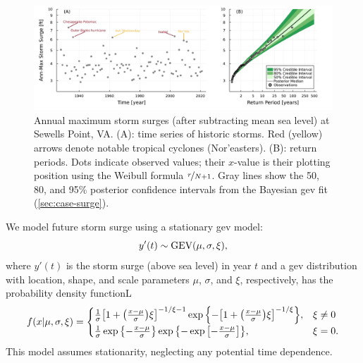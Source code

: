 \documentclass[11pt]{article}
\begin{document}
\begin{figure}
    \centering
    \includegraphics[width=\textwidth]{surge-obs-return}
    \caption{
        Annual maximum storm surges (after subtracting mean sea level) at Sewells Point, VA.
        (A):
        time series of historic storms.
        Red (yellow) arrows denote notable tropical cyclones (Nor'easters).
        (B):
        return periods.
        Dots indicate observed values; their $x$-value is their plotting position using the Weibull formula $\nicefrac{r}{N+1}$.
        Gray lines show the 50, 80, and 95\% posterior confidence intervals from the Bayesian \gls{gev} fit (\cref{sec:case-surge}).
    }\label{fig:surge-obs-return}
\end{figure}

We model future storm surge using a stationary \gls{gev} model:
\begin{equation}\label{eq:surge-model}
    y'(t) \sim \text{GEV}\qty(\mu, \sigma, \xi),
\end{equation}
where $y'(t)$ is the storm surge (above sea level) in year $t$ and a \gls{gev} distribution with location, shape, and scale parameters $\mu$, $\sigma$, and $\xi$, respectively, has the probability density functionL
\begin{equation}\label{eq:gev-dist}
    f(x | \mu, \sigma, \xi)= \begin{cases}
        \frac{1}{\sigma} \qty[ 1 + \qty( \frac{x-\mu}{\sigma} ) \xi ]^{-1 / \xi - 1} \exp \qty{- \qty[1+\qty(\frac{x-\mu}{\sigma}) \xi ]^{-1 / \xi} }, & \xi \neq 0 \\
        \frac{1}{\sigma} \exp \qty{-\frac{x-\mu}{\sigma}} \exp \qty{ -\exp \qty[-\frac{x-\mu}{\sigma}]},                                               & \xi=0.
    \end{cases}
\end{equation}
This model assumes stationarity, neglecting any potential time dependence.
\end{document}

